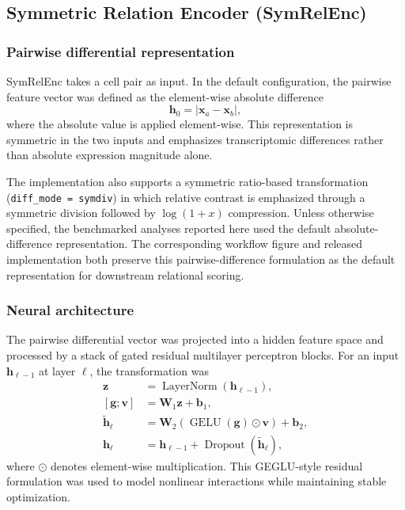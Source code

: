 \documentclass[11pt]{article}
\begin{document}
\subsection{Symmetric Relation Encoder (SymRelEnc)}

\subsubsection{Pairwise differential representation}

SymRelEnc takes a cell pair as input. In the default configuration, the pairwise feature vector was defined as the element-wise absolute difference
\begin{equation}
\mathbf{h}_{0} = \left| \mathbf{x}_a - \mathbf{x}_b \right|,
\label{eq:pairwise_abs}
\end{equation}
where the absolute value is applied element-wise. This representation is symmetric in the two inputs and emphasizes transcriptomic differences rather than absolute expression magnitude alone.

The implementation also supports a symmetric ratio-based transformation (\texttt{diff\_mode = symdiv}) in which relative contrast is emphasized through a symmetric division followed by $\log(1+x)$ compression. Unless otherwise specified, the benchmarked analyses reported here used the default absolute-difference representation. The corresponding workflow figure and released implementation both preserve this pairwise-difference formulation as the default representation for downstream relational scoring. 

\subsubsection{Neural architecture}

The pairwise differential vector was projected into a hidden feature space and processed by a stack of gated residual multilayer perceptron blocks. For an input $\mathbf{h}_{\ell-1}$ at layer $\ell$, the transformation was
\begin{equation}
\begin{aligned}
\mathbf{z} &= \operatorname{LayerNorm}\!\left(\mathbf{h}_{\ell-1}\right), \\
\left[\mathbf{g};\mathbf{v}\right] &= \mathbf{W}_{1}\mathbf{z} + \mathbf{b}_{1}, \\
\widetilde{\mathbf{h}}_{\ell} &= \mathbf{W}_{2}\!\left(\operatorname{GELU}(\mathbf{g}) \odot \mathbf{v}\right) + \mathbf{b}_{2}, \\
\mathbf{h}_{\ell} &= \mathbf{h}_{\ell-1} + \operatorname{Dropout}\!\left(\widetilde{\mathbf{h}}_{\ell}\right),
\end{aligned}
\label{eq:geglu_block}
\end{equation}
where $\odot$ denotes element-wise multiplication. This GEGLU-style residual formulation was used to model nonlinear interactions while maintaining stable optimization\cite{Dauphin2017GLU,Shazeer2020GEGLU}.
\end{document}
